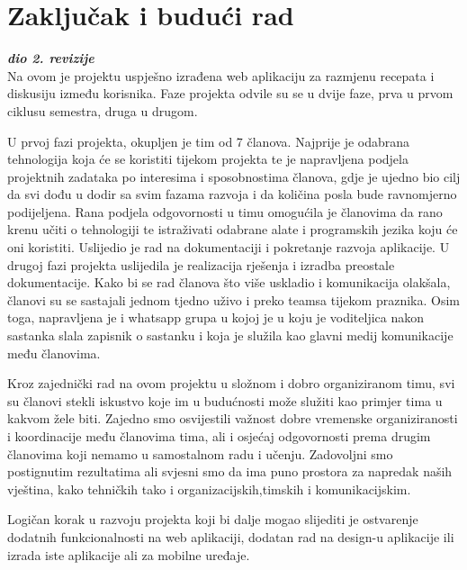 \chapter{Zaključak i budući rad}
		
		\textbf{\textit{dio 2. revizije}}\\
		
        Na ovom je projektu uspješno izrađena web aplikaciju za razmjenu recepata i diskusiju između korisnika. Faze projekta odvile su se u dvije faze, prva u prvom ciklusu semestra, druga u drugom.
        
        U prvoj fazi projekta, okupljen je tim od 7 članova. Najprije je odabrana tehnologija koja će se koristiti tijekom projekta te je napravljena podjela projektnih zadataka po interesima i sposobnostima članova, gdje je ujedno bio cilj da svi dođu u dodir sa svim fazama razvoja i da količina posla bude ravnomjerno podijeljena. Rana podjela odgovornosti u timu omogućila je članovima da rano krenu učiti o tehnologiji te istraživati odabrane alate i programskih jezika koju će oni koristiti. Uslijedio je rad na dokumentaciji i pokretanje razvoja aplikacije.
        U drugoj fazi projekta uslijedila je realizacija rješenja i izradba preostale dokumentacije. Kako bi se rad članova što više uskladio i komunikacija olakšala, članovi su se sastajali jednom tjedno uživo i preko teamsa tijekom praznika. Osim toga, napravljena je i whatsapp grupa u kojoj je u koju je voditeljica nakon sastanka slala zapisnik o sastanku i koja je služila kao glavni medij komunikacije među članovima.
        
        Kroz zajednički rad na ovom projektu u složnom i dobro organiziranom timu, svi su članovi stekli iskustvo koje im u budućnosti može služiti kao primjer tima u kakvom žele biti. Zajedno smo osvijestili važnost dobre vremenske organiziranosti i koordinacije među članovima tima, ali i osjećaj odgovornosti prema drugim članovima koji nemamo u samostalnom radu i učenju. Zadovoljni smo postignutim rezultatima ali svjesni smo da ima puno prostora za napredak naših vještina, kako tehničkih tako i organizacijskih,timskih i komunikacijskim.

        Logičan korak u razvoju projekta koji bi dalje mogao slijediti je ostvarenje dodatnih funkcionalnosti na web aplikaciji, dodatan rad na design-u aplikacije ili izrada iste aplikacije ali za mobilne uređaje.
		\eject 